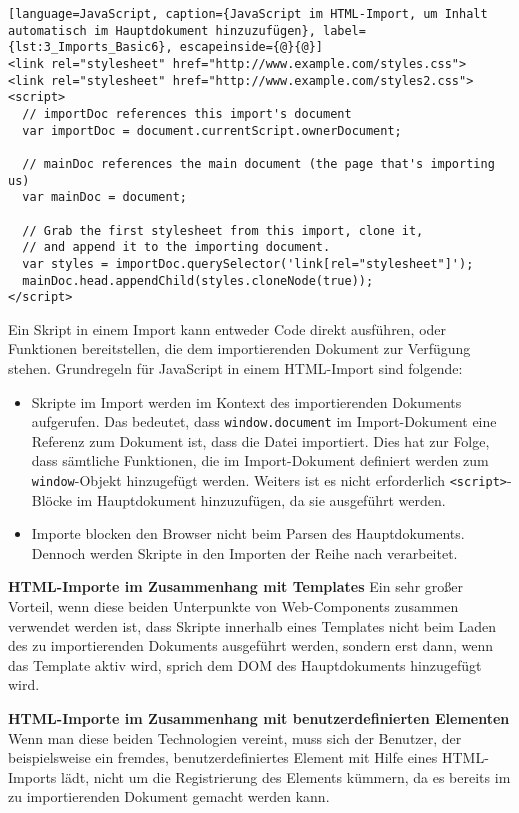 \begin{lstlisting}[language=JavaScript, caption={JavaScript im HTML-Import, um Inhalt automatisch im Hauptdokument hinzuzufügen}, label={lst:3_Imports_Basic6}, escapeinside={@}{@}]
<link rel="stylesheet" href="http://www.example.com/styles.css">
<link rel="stylesheet" href="http://www.example.com/styles2.css">
<script>
  // importDoc references this import's document
  var importDoc = document.currentScript.ownerDocument;

  // mainDoc references the main document (the page that's importing us)
  var mainDoc = document;

  // Grab the first stylesheet from this import, clone it,
  // and append it to the importing document.
  var styles = importDoc.querySelector('link[rel="stylesheet"]');
  mainDoc.head.appendChild(styles.cloneNode(true));
</script>
\end{lstlisting}

Ein Skript in einem Import kann entweder Code direkt ausführen, oder Funktionen bereitstellen, die dem importierenden Dokument zur Verfügung stehen. Grundregeln für JavaScript in einem HTML-Import sind folgende:
\begin{itemize}
\item Skripte im Import werden im Kontext des importierenden Dokuments aufgerufen. Das bedeutet, dass \lstinline|window.document| im Import-Dokument eine Referenz zum Dokument ist, dass die Datei importiert. Dies hat zur Folge, dass sämtliche Funktionen, die im Import-Dokument definiert werden zum \lstinline|window|-Objekt hinzugefügt werden. Weiters ist es nicht erforderlich \lstinline|<script>|-Blöcke im Hauptdokument hinzuzufügen, da sie ausgeführt werden.
\item Importe blocken den Browser nicht beim Parsen des Hauptdokuments. Dennoch werden Skripte in den Importen der Reihe nach verarbeitet.
\end{itemize}

\textbf{HTML-Importe im Zusammenhang mit Templates}
Ein sehr großer Vorteil, wenn diese beiden Unterpunkte von Web-Components zusammen verwendet werden ist, dass Skripte innerhalb eines Templates nicht beim Laden des zu importierenden Dokuments ausgeführt werden, sondern erst dann, wenn das Template aktiv wird, sprich dem DOM des Hauptdokuments hinzugefügt wird.

\textbf{HTML-Importe im Zusammenhang mit benutzerdefinierten Elementen}
Wenn man diese beiden Technologien vereint, muss sich der Benutzer, der beispielsweise ein fremdes, benutzerdefiniertes Element mit Hilfe eines HTML-Imports lädt, nicht um die Registrierung des Elements kümmern, da es bereits im zu importierenden Dokument gemacht werden kann.

